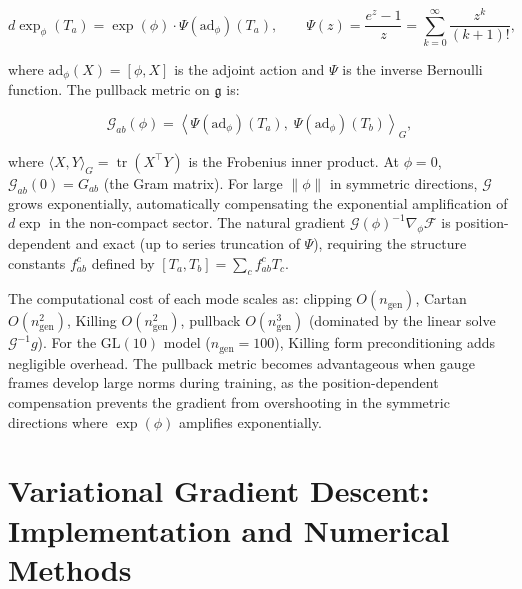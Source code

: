 \documentclass[twoside,11pt]{article}
\begin{document}
\begin{equation}
d\exp_\phi(T_a) = \exp(\phi) \cdot \Psi(\mathrm{ad}_\phi)(T_a), \qquad \Psi(z) = \frac{e^z - 1}{z} = \sum_{k=0}^{\infty} \frac{z^k}{(k+1)!},
\end{equation}

where $\mathrm{ad}_\phi(X) = [\phi, X]$ is the adjoint action and $\Psi$ is the inverse Bernoulli function. The pullback metric on $\mathfrak{g}$ is:

\begin{equation}
\mathcal{G}_{ab}(\phi) = \left\langle \Psi(\mathrm{ad}_\phi)(T_a),\; \Psi(\mathrm{ad}_\phi)(T_b) \right\rangle_G,
\label{eq:pullback_metric}
\end{equation}

where $\langle X, Y \rangle_G = \operatorname{tr}(X^\top Y)$ is the Frobenius inner product. At $\phi = 0$, $\mathcal{G}_{ab}(0) = G_{ab}$ (the Gram matrix). For large $\|\phi\|$ in symmetric directions, $\mathcal{G}$ grows exponentially, automatically compensating the exponential amplification of $d\exp$ in the non-compact sector. The natural gradient $\mathcal{G}(\phi)^{-1} \nabla_\phi \mathcal{F}$ is position-dependent and exact (up to series truncation of $\Psi$), requiring the structure constants $f^c_{ab}$ defined by $[T_a, T_b] = \sum_c f^c_{ab} T_c$.

The computational cost of each mode scales as: clipping $O(n_{\mathrm{gen}})$, Cartan $O(n_{\mathrm{gen}}^2)$, Killing $O(n_{\mathrm{gen}}^2)$, pullback $O(n_{\mathrm{gen}}^3)$ (dominated by the linear solve $\mathcal{G}^{-1} g$). For the $\mathrm{GL}(10)$ model ($n_{\mathrm{gen}} = 100$), Killing form preconditioning adds negligible overhead. The pullback metric becomes advantageous when gauge frames develop large norms during training, as the position-dependent compensation prevents the gradient from overshooting in the symmetric directions where $\exp(\phi)$ amplifies exponentially.


\section{Variational Gradient Descent: Implementation and Numerical Methods}
\end{document}
